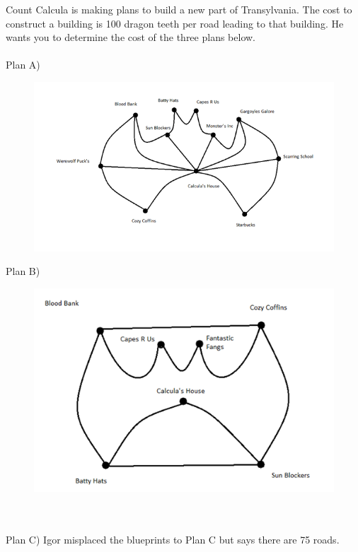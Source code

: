 


Count Calcula is making plans to build a new part of Transylvania. The cost to construct a building is 100 dragon teeth per road leading to that building. He wants you to determine the cost of the three plans below.
\\
\\
Plan A)

\begin{figure}[h!]
\centering
\includegraphics[scale=.7]{assets/josh/plana}
\end{figure}



Plan B)
\begin{figure}[h!]
\centering
\includegraphics[scale=.7]{assets/josh/planb}
\end{figure}
\\
\\
Plan C)
Igor misplaced the blueprints to Plan C but says there are 75 roads.

